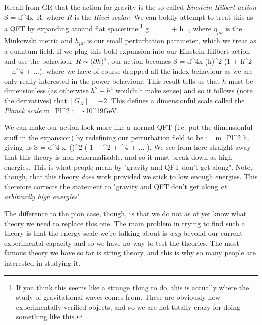 Recall from GR that the action for gravity is the so-called \textit{Einstein-Hilbert action}
\bse 
    S =  \int d^4x\,  R,
\ese 
where $R$ is the \textit{Ricci scalar}. We can boldly attempt to treat this as a QFT by expanding around flat spacetime:\footnote{If you think this seems like a strange thing to do, this is actually where the study of gravitational waves comes from. These are obviously now experimentally verified objects, and so we are not totally crazy for doing something like this.} 
\bse 
    g_{\mu\nu} = \eta_{\mu\nu} + h_{\mu\nu},
\ese 
where $\eta_{\mu\nu}$ is the Minkowski metric and $h_{\mu\nu}$ is our small perturbation parameter, which we treat as a quantum field. If we plug this bold expansion into our Einstein-Hilbert action and use the behaviour $R \sim (\partial h)^2$, our action becomes 
\bse 
    S = \int d^4x (\p h)^2 \big(1 + h^2 + h^4 + ...\big),
\ese 
where we have of course dropped all the index behaviour as we are only really interested in the power behaviour. This result tells us that $h$ must be dimensionless (as otherwise $h^2+h^4$ wouldn't make sense) and so it follows (note the derivatives) that $[G_N]=-2$. This defines a dimensionful scale called the \textit{Planck scale}
\bse 
    m_{Pl}^2 :=  \sim 10^{19}GeV.
\ese 

We can make our action look more like a normal QFT (i.e. put the dimensionful stuff in the expansion) by redefining our perturbation field to be 
\bse 
     := m_{Pl}^2 h,
\ese 
giving us 
\bse 
    S = \int d^4 x\, \big(\p{}\big)^2 \bigg( 1 + ^2 + ^4 + ... \bigg).
\ese 
We see from here straight away that this theory is non-renormalisable, and so it must break down as high energies. This is what people mean by "gravity and QFT don't get along". Note, though, that this theory \textit{does} work provided we stick to low enough energies. This therefore corrects the statement to "gravity and QFT don't get along \textit{at arbitrarily high energies}". 

The difference to the pion case, though, is that we do not as of yet know what theory we need to replace this one. The main problem in trying to find such a theory is that the energy scale we're talking about is \textit{way} beyond our current experimental capacity and so we have no way to test the theories. The most famous theory we have so far is string theory, and this is why so many people are interested in studying it. 